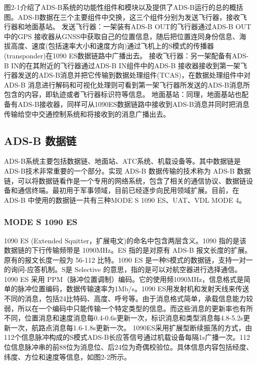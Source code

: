 
图2-1介绍了ADS-B系统的功能性组件和模块以及提供了ADS-B运行的总的概括图。ADS-B数据在三个主要组件中交换，这三个组件分别为发送飞行器，接收飞行器和地面基站。\newline
发送飞行器：一架装有ADS-B OUT的飞行器通过ADS-B OUT中的GPS 接收器从GNSS中获取自己的位置信息，随后把位置连同身份信息、海拔高度、速度(包括速率大小和速度方向)通过飞机上的S模式的传播器(transponder)在1090 ES数据链路中广播出去。\newline
接收飞行器：另一架配备有ADS-B IN的在其附近的飞行器通过ADS-B IN组件中的ADS-B 接收器接收到第一架飞行器发送的ADS-B消息并把它传输到数据处理组件(TCAS)，在数据处理组件中对ADS-B 消息进行解码和可视化处理则可看到第一架飞行器所发送的ADS-B消息所包含的内容，即轨迹或者飞行器标识符等信息。\newline
地面基站：同理，地面基站也配备有ADS-B接收器，同样可从1090ES数据链路中接收到ADS-B消息并同时把消息传输给空中交通控制系统和将接收到的消息广播出去。
\subsection{ADS-B 数据链}
ADS-B系统主要包括数据链、地面站、ATC系统、机载设备等。其中数据链是ADS-B技术非常重要的一个部分。实现 ADS-B 数据传输的技术称为 ADS-B 数据链，可以将数据链看作是一个专用的网络系统，包含了相关的通信协议、数据链设备和通信终端\cite{he2010adsb}。最初用于军事领域，目前已经逐步向民用领域扩展。目前，在 ADS-B 中使用的数据链一共有三种MODE S 1090 ES、UAT、VDL MODE 4\cite{shi2007adsb}。
\subsubsection{MODE S 1090 ES}
1090 ES (Extended Squitter，扩展电文)的命名中包含两层含义。1090 指的是该数据链的下行传输频带是 1090MHz。ES 指的是对原有 ADS-B 报文长度的扩展。原有的报文长度一般为 56-112 比特。1090 ES 是一种S模式的数据链，支持一对一的询问-应答机制\cite{yang2014adsb}。S是 Selective 的意思，指的是可以对航空器进行选择通信。1090 ES 采用 PPM（脉冲位置调制）编码。它的使用频1090MHz，信息格式是简单的脉冲位置编码，数据传输速率为1Mb/s。1090 ES用发射机和发射天线来传送不同的消息，包括24比特码、高度、呼号等。由于消息格式简单，承载信息能力较弱，所以在一个编码中只能传输一个特定类型的信息。而这些消息的更新率也有所不同，位置消息和速度消息每0.4-0.6s更新一次，标识消息和类型消息每4.8-5.2s更新一次，航路点消息每1.6-1.8s更新一次。 1090ES采用扩展型断续振荡的方式，由112个信息脉冲构成的S模式ADS-B长应答信号通过机载设备每隔1s广播一次。112位信息脉冲串的前88位为消息位、后24位为奇偶校验位。具体信息内容包括经度、纬度、方位和速度等信息，如图2-2所示。


